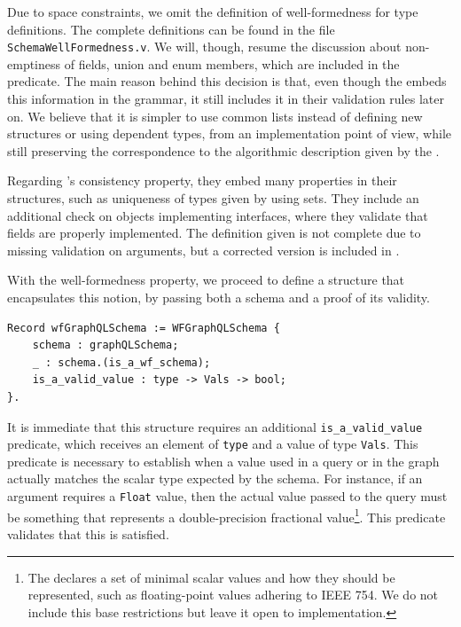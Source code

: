 Due to space constraints, we omit the definition of well-formedness for type definitions. The complete definitions can be found in the file \texttt{SchemaWellFormedness.v}. We will, though, resume the discussion about non-emptiness of fields, union and enum members, which are included in the predicate. The main reason behind this decision is that, even though the \spec{} embeds this information in the grammar, it still includes it in their validation rules later on. We believe that it is simpler to use common lists instead of defining new structures or using dependent types, from an implementation point of view, while still preserving the correspondence to the algorithmic description given by the \spec{}.

Regarding \HP{}'s consistency property, they embed many properties in their structures, such as uniqueness of types given by using sets. They include an additional check on objects implementing interfaces, where they validate that fields are properly implemented. The definition given is not complete due to missing validation on arguments, but a corrected version is included in \cite{olafschema}.



With the well-formedness property, we proceed to define a structure that encapsulates this notion, by passing both a schema and a proof of its validity.

\begin{verbatim}
Record wfGraphQLSchema := WFGraphQLSchema {
    schema : graphQLSchema;
    _ : schema.(is_a_wf_schema);
    is_a_valid_value : type -> Vals -> bool;
}.
\end{verbatim}

It is immediate that this structure requires an additional \texttt{is_a_valid_value} predicate, which receives an element of \texttt{type} and a value of type \texttt{Vals}. This predicate is necessary to establish when a value used in a query or in the graph actually matches the scalar type expected by the schema. For instance, if an argument requires a \texttt{Float} value, then the actual value passed to the query must be something that represents a double-precision fractional value\footnote{The \spec{} declares a set of minimal scalar values and how they should be represented, such as floating-point values adhering to IEEE 754. We do not include this base restrictions but leave it open to implementation.}. This predicate validates that this is satisfied.


